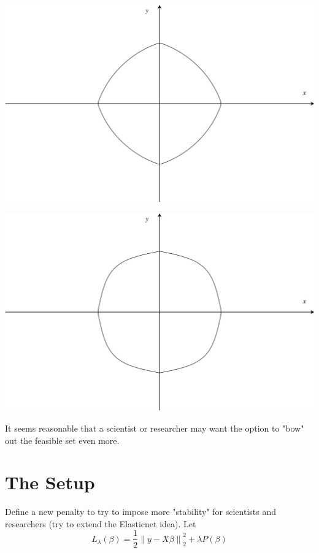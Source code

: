 \documentclass[10pt, reqno]{article}
\numberwithin{equation}{section}
\newcommand{\norm}[1]{\left\lVert#1\right\rVert}
\begin{document}
\vspace{.5cm}
\begin{center}
\begin{minipage}{.5\textwidth}
  \centering
  \includegraphics[width=.9\linewidth]{elasticnet.png}
\end{minipage}%
\begin{minipage}{.5\textwidth}
  \centering
  \includegraphics[width=.9\linewidth]{new_penalty_4_moment.png}
\end{minipage}
\end{center}
\vspace{.5cm}

It seems reasonable that a scientist or researcher may want the option to "bow" out the feasible set even more.

\newpage
\section*{The Setup}

Define a new penalty to try to impose more "stability" for scientists and researchers (try to extend the Elasticnet idea). Let
\[
L_{\lambda}(\beta) = \frac{1}{2} \norm{y - X \beta}_2^2 + \lambda P(\beta)
\]
\end{document}
